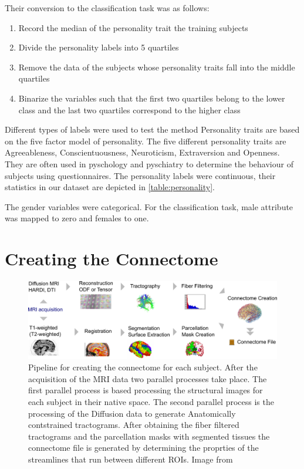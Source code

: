 \documentclass[msthesis.tex]{subfiles}
\begin{document}
Their conversion to the classification task was as follows:
\begin{enumerate}
\item Record the median of the personality trait the training subjects
\item Divide the personality labels into 5 quartiles
 \item Remove the data of the subjects whose personality traits fall into the middle quartiles
 \item Binarize the variables such that the first two quartiles belong to the lower class and the last two quartiles correspond to the higher class
\end{enumerate}
Different types of labels were used to test the method
Personality traits are based on the five factor model of personality. The five different personality traits are Agreeableness, Conscientuousness, Neuroticism, Extraversion and Openness. They are often used in pyschology and pyschiatry to determine the behaviour of subjects
using questionnaires. The personality labels were continuous, their statistics in our dataset are depicted in \autoref{table:personality}.

The gender variables were categorical. For the classification task, male attribute was mapped to zero and females to one.


\section{Creating the Connectome}
\label{sec:creating_connectome}
\begin{figure}
    \centering
    \includegraphics[width=\textwidth]{images/connectome_creation_workflow.png}
    \caption{Pipeline for creating the connectome for each subject. After the acquisition of the MRI data two parallel processes take place. The first parallel process is based processing the structural images for each subject in their native space. The second parallel process is the processing of the Diffusion data to generate Anatomically contstrained tractograms. After obtaining the fiber filtered tractograms and the parcellation masks with segmented tissues the connectome file is generated by determining the proprties of the streamlines that run between different ROIs. Image from \cite{gerhard2011connectome}}
    \label{fig:connectome_pipeline}
\end{figure}
\end{document}
